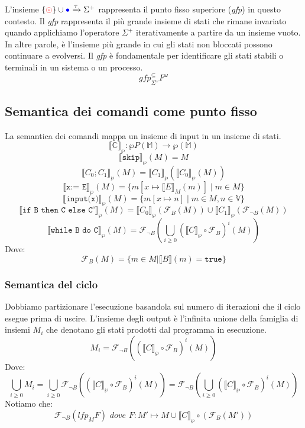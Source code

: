 L'insieme $\{\textcolor{red}{\odot}\} \cup \textcolor{blue}{\bullet}\xrightarrow[]
{\tau} \Sigma^{+}$ rappresenta il punto fisso superiore
(\textit{gfp}) in questo contesto. Il \textit{gfp} rappresenta il
più grande insieme di stati che rimane invariato quando applichiamo
l'operatore $\Sigma^{+}$ iterativamente a partire da un insieme
vuoto. In altre parole, è l'insieme più grande in cui gli stati
non bloccati possono continuare a evolversi. Il \textit{gfp} è
fondamentale per identificare gli stati stabili o terminali in un
sistema o un processo.
\[
  \textit{gfp}^{\subseteq}_{\Sigma^\omega}F^\omega
\]

\subsection{Semantica dei comandi come punto fisso}
La semantica dei comandi mappa un insieme di input in un 
insieme di stati.
\[
  \llbracket \mathbb{C} \rrbracket_\wp : \wp{P}(\mathbb{M}) \rightarrow \wp(\mathbb{M})
\]
\[
  \llbracket \texttt{skip} \rrbracket_\wp(M) = M
\]
\[
  \llbracket {C_0;C_1} \rrbracket_\wp(M) = \llbracket {C_1} \rrbracket_\wp(\llbracket {C_0} \rrbracket_\wp(M))
\]
\[
  \llbracket {\texttt{x:= E}} \rrbracket_\wp(M) = \{m[x \mapsto \llbracket {E} \rrbracket_M(m)] \mid m \in M\}
\]
\[
  \llbracket \texttt{input(x)} \rrbracket_\wp(M) = \{m[x \mapsto n] \mid m \in M, n \in \mathbb{V}\}
\]
\[
  \llbracket {\texttt{if B then C else C'}} \rrbracket_\wp(M) = \llbracket C_0 \rrbracket_\wp 
  (\mathcal{F}_B (M)) \cup \llbracket C_1 \rrbracket_\wp (\mathcal{F}_{\neg B} (M))
\]
\[
  \llbracket {\texttt{while B do C}} \rrbracket_\wp(M) = \mathcal{F}_{\neg B}
  \left ( \bigcup_{i \geq 0}(\llbracket C \rrbracket_\wp \circ 
  \mathcal{F}_B)^i (M)\right )
\]
Dove:
\[
  \mathcal{F}_B(M)= \{m \in M | 
  \llbracket B \rrbracket (m) = \texttt{true}\}
\]
\subsubsection{Semantica del ciclo}
Dobbiamo partizionare l'esecuzione basandola sul numero di iterazioni
che il ciclo esegue prima di uscire.
L'insieme degli output è l'infinita unione della famiglia di insiemi $M_i$
che denotano gli stati prodotti dal programma in esecuzione.
\[
  M_i = \mathcal{F}_{\neg B}\left ( (\llbracket C \rrbracket_\wp \circ \mathcal{F}_B)^i (M)\right )
\]
Dove:
\[
\bigcup_{i \geq 0}M_i = \bigcup_{i\geq 0} \mathcal{F}_{\neg B}\left ( (\llbracket C \rrbracket_\wp \circ \mathcal{F}_B)^i (M)\right )
= \mathcal{F}_{\neg B}\left ( \bigcup_{i \geq 0}(\llbracket C \rrbracket_\wp \circ \mathcal{F}_B)^i (M)\right )
\]
Notiamo che:
\[
  \mathcal{F}_{\neg B}(\textit{lfp}_M F) \textit{ dove }F : M' \mapsto M \cup \llbracket C \rrbracket_\wp  \circ (\mathcal{F}_B(M'))
\]

